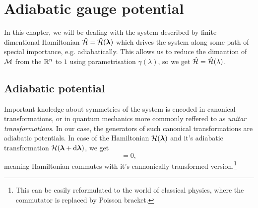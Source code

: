 \section{Adiabatic gauge potential}
In this chapter, we will be dealing with the system described by finite-dimentional Hamiltonian $\hat{\mathcal{H}}=\hat{\mathcal{H}}(\bm\lambda)$ which drives the system along some path of special importance, e.g. adiabatically. This allows us to reduce the dimantion of $\mathcal{M}$ from the $\mathbb{R}^n$ to $1$ using parametrisation $\gamma(\lambda)$, so we get $\hat{\mathcal{H}}=\hat{\mathcal{H}}(\lambda)$.

\subsection{Adiabatic potential}
Important knoledge about symmetries of the system is encoded in canonical transformations, or in quantum mechanics more commonly reffered to as \emph{unitar transformations}. In our case, the generators of such canonical transformations are adiabatic potentials. In case of the Hamiltonian $\mathcal{H}(\bm\lambda)$ and it's adiabatic transformation $\mathcal{H}(\bm\lambda+\mathrm{d} \bm\lambda)$, we get
\begin{equation}
    [\HH(\llambda),\HH(\llambda+\d \llambda)]=0,
\end{equation}
meaning Hamiltonian commutes with it's cannonically transformed version.\footnote{This can be easily reformulated to the world of classical physics, where the commutator is replaced by Poisson bracket.}


